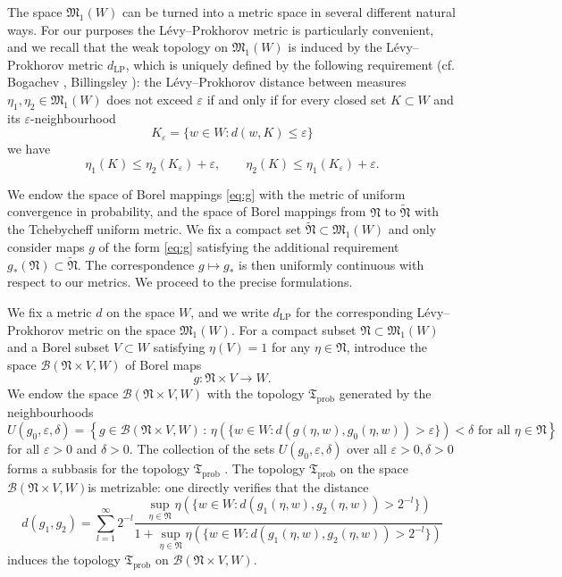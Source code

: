 \documentclass[12pt,a4paper]{article}
\theoremstyle{definition}
\theoremstyle{remark}
\newcommand{\BB}{\mathscr{B}}
\newcommand{\MM}{{\mathfrak{M}}}
\newcommand{\NN}{{\mathfrak{N}}}
\newcommand{\TT}{{\mathfrak{T}}}
\begin{document}
	The space $\MM_1(W)$ can be turned into a metric space in several different natural ways. For our purposes  the L\'evy--Prokhorov metric is particularly convenient, and we recall that the weak topology on $\MM_1(W)$ is induced by the L\'evy--Prokhorov
	metric $d_{\mathrm{LP}}$, which is uniquely defined by the following requirement (cf. Bogachev \cite{Bogachev}, Billingsley \cite{Billingsley}): the
	L\'evy--Prokhorov distance between measures $\eta_1, \eta_2 \in \MM_1(W)$ does not exceed $\varepsilon$ if
	and only if for every closed set $K \subset W$ and its $\varepsilon$-neighbourhood
	\[
	K_\varepsilon = \{ w \in W : d(w, K) \le \varepsilon \}
	\]
	we have
	\[
	\eta_1(K) \le \eta_2(K_\varepsilon) + \varepsilon, \qquad
	\eta_2(K) \le \eta_1(K_\varepsilon) + \varepsilon.
	\]
	
	We endow the space of Borel mappings \eqref{eq:g} with the metric of uniform convergence in probability, and
	the space of Borel mappings from $\NN$ to $\widetilde{\NN}$ with the  Tchebycheff uniform metric. We fix a compact set $\widetilde{\NN} \subset \MM_1(W)$ and only consider maps $g$ of the form \eqref{eq:g} satisfying the additional requirement
	$g_*(\NN) \subset \widetilde{\NN}$. The correspondence $g \mapsto g_*$ is then uniformly continuous with respect to our metrics. We 
	proceed to the precise formulations.
	
	We fix a metric $d$  on the space $W$, and we  write $d_{\mathrm{LP}}$ for the corresponding L\'evy--Prokhorov metric on the space $\MM_1(W)$. For a compact subset $\NN \subset \MM_1(W)$ and a Borel subset $V \subset W$ satisfying
	$\eta(V) = 1$ for any $\eta \in \NN$, introduce the space $\BB(\NN \times V, W)$ of Borel maps $$g \colon \NN \times V \to W.$$
	We endow the space $\BB(\NN \times V, W)$ with the topology $\TT_{\mathrm{prob}}$ generated by the neighbourhoods
	\[
	U(g_0, \varepsilon, \delta) = \left\{
	g \in \BB(\NN \times V, W) \,:\, \eta(\{w \in W : d(g(\eta, w), g_0(\eta, w)) > \varepsilon\}) < \delta \text{ for all } \eta \in \NN
	\right\}
	\]
	for all $\varepsilon > 0$ and $\delta > 0$. The collection of the sets $U(g_0, \varepsilon, \delta)$ over all $\varepsilon>0, \delta >0$ forms a subbasis for the topology $\TT_{\mathrm{prob}}$ . The topology  $\TT_{\mathrm{prob}}$ on the space $\BB(\NN \times V, W)$is metrizable: one directly verifies
	that the distance
	\[
	d(g_1, g_2) =
	\sum_{l=1}^{\infty}
	2^{-l}
	\frac{\displaystyle\sup_{\eta \in \NN}
		\eta(\{w \in W : d(g_1(\eta, w), g_2(\eta, w)) > 2^{-l}\})}
	{1 + \displaystyle\sup_{\eta \in \NN}
		\eta(\{w \in W : d(g_1(\eta, w), g_2(\eta, w)) > 2^{-l}\})}
	\]
	induces the topology $\TT_{\mathrm{prob}}$ on $\BB(\NN \times V, W)$.
	
\end{document}
